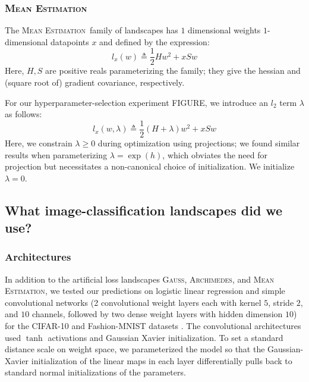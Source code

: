 \documentclass{article}
\theoremstyle{plain}
\theoremstyle{definition}
\newcommand{\Gauss}{\textsc{Gauss}}
\newcommand{\Archimedes}{\textsc{Archimedes}}
\newcommand{\MeanEstimation}{\textsc{Mean Estimation}}
\begin{document}
        \subsubsection*{\MeanEstimation}
            The \MeanEstimation\, family of landscapes has $1$ dimensional
            weights $1$-dimensional datapoints $x$ and defined by the
            expression:
            $$
                l_x(w)
                \triangleq
                \frac{1}{2} H w^2 + x S w
            $$
            Here, $H, S$ are positive reals parameterizing the family; they
            give the hessian and (square root of) gradient covariance,
            respectively.

            For our hyperparameter-selection experiment {\color{red} FIGURE},
            we introduce an $l_2$ term $\lambda$ as follows:
            $$
                l_x(w, \lambda)
                \triangleq
                \frac{1}{2} (H + \lambda) w^2 + x S w
            $$
            Here, we constrain $\lambda\geq 0$ during optimization using
            projections; we found similar results when parameterizing
            $\lambda = \exp(h)$, which obviates the need for projection but
            necessitates a non-canonical choice of initialization.  We
            initialize $\lambda=0$.

    \subsection{What image-classification landscapes did we use?}   \label{appendix:natural}

        \subsubsection*{Architectures}
            In addition to the artificial loss landscapes
            \Gauss, \Archimedes, and \MeanEstimation, 
            we tested our predictions on logistic linear regression
            and simple convolutional networks (2 convolutional weight layers
            each with kernel $5$, stride $2$, and $10$ channels, followed by
            two dense weight layers with hidden dimension $10$) for the
            CIFAR-10 \cite{kr09} and Fashion-MNIST datasets \cite{xi17}.  The
            convolutional architectures used $\tanh$ activations and Gaussian
            Xavier initialization.  To set a standard distance scale on weight
            space, we parameterized the model so that the
            Gaussian-Xavier initialization of the linear maps in each layer
            differentially pulls back to standard normal initializations of the
            parameters.
            
\end{document}
